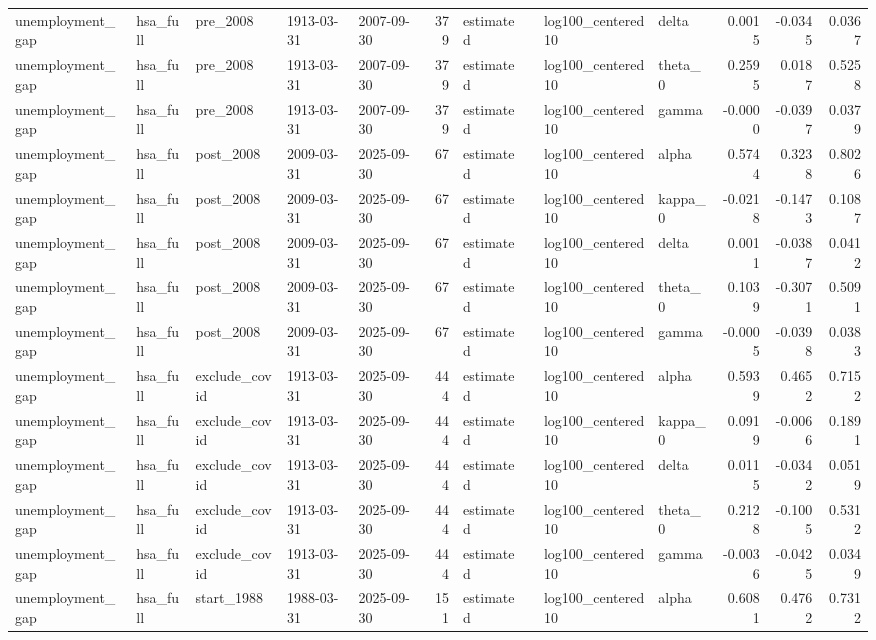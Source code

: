 \begin{tabular}{lllllrllllrrr}
unemployment\_gap & hsa\_full & pre\_2008 & 1913-03-31 & 2007-09-30 & 379 & estimated &  & log100\_centered10 & delta & 0.0015 & -0.0345 & 0.0367 \\
unemployment\_gap & hsa\_full & pre\_2008 & 1913-03-31 & 2007-09-30 & 379 & estimated &  & log100\_centered10 & theta\_0 & 0.2595 & 0.0187 & 0.5258 \\
unemployment\_gap & hsa\_full & pre\_2008 & 1913-03-31 & 2007-09-30 & 379 & estimated &  & log100\_centered10 & gamma & -0.0000 & -0.0397 & 0.0379 \\
unemployment\_gap & hsa\_full & post\_2008 & 2009-03-31 & 2025-09-30 & 67 & estimated &  & log100\_centered10 & alpha & 0.5744 & 0.3238 & 0.8026 \\
unemployment\_gap & hsa\_full & post\_2008 & 2009-03-31 & 2025-09-30 & 67 & estimated &  & log100\_centered10 & kappa\_0 & -0.0218 & -0.1473 & 0.1087 \\
unemployment\_gap & hsa\_full & post\_2008 & 2009-03-31 & 2025-09-30 & 67 & estimated &  & log100\_centered10 & delta & 0.0011 & -0.0387 & 0.0412 \\
unemployment\_gap & hsa\_full & post\_2008 & 2009-03-31 & 2025-09-30 & 67 & estimated &  & log100\_centered10 & theta\_0 & 0.1039 & -0.3071 & 0.5091 \\
unemployment\_gap & hsa\_full & post\_2008 & 2009-03-31 & 2025-09-30 & 67 & estimated &  & log100\_centered10 & gamma & -0.0005 & -0.0398 & 0.0383 \\
unemployment\_gap & hsa\_full & exclude\_covid & 1913-03-31 & 2025-09-30 & 444 & estimated &  & log100\_centered10 & alpha & 0.5939 & 0.4652 & 0.7152 \\
unemployment\_gap & hsa\_full & exclude\_covid & 1913-03-31 & 2025-09-30 & 444 & estimated &  & log100\_centered10 & kappa\_0 & 0.0919 & -0.0066 & 0.1891 \\
unemployment\_gap & hsa\_full & exclude\_covid & 1913-03-31 & 2025-09-30 & 444 & estimated &  & log100\_centered10 & delta & 0.0115 & -0.0342 & 0.0519 \\
unemployment\_gap & hsa\_full & exclude\_covid & 1913-03-31 & 2025-09-30 & 444 & estimated &  & log100\_centered10 & theta\_0 & 0.2128 & -0.1005 & 0.5312 \\
unemployment\_gap & hsa\_full & exclude\_covid & 1913-03-31 & 2025-09-30 & 444 & estimated &  & log100\_centered10 & gamma & -0.0036 & -0.0425 & 0.0349 \\
unemployment\_gap & hsa\_full & start\_1988 & 1988-03-31 & 2025-09-30 & 151 & estimated &  & log100\_centered10 & alpha & 0.6081 & 0.4762 & 0.7312 \\

\end{tabular}
